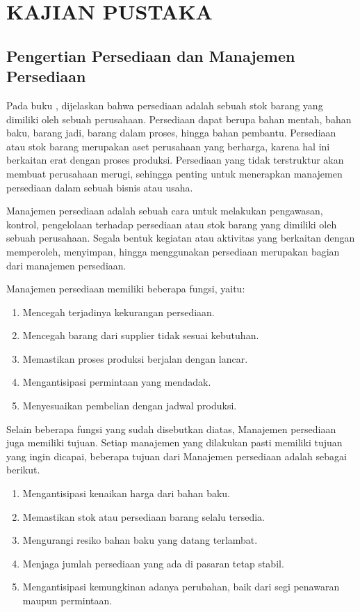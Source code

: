 
\chapter{KAJIAN PUSTAKA} 

\section{Pengertian Persediaan dan Manajemen Persediaan}

Pada buku \citep{dasarmanajemen}, dijelaskan bahwa persediaan adalah sebuah stok barang yang dimiliki oleh sebuah perusahaan. Persediaan dapat berupa bahan mentah, bahan baku, barang jadi, barang dalam proses, hingga bahan pembantu. Persediaan atau stok barang merupakan aset perusahaan yang berharga, karena hal ini berkaitan erat dengan proses produksi. Persediaan yang tidak terstruktur akan membuat perusahaan merugi, sehingga penting untuk menerapkan manajemen persediaan dalam sebuah bisnis atau usaha.

Manajemen persediaan adalah sebuah cara untuk melakukan pengawasan, kontrol, pengelolaan terhadap persediaan atau stok barang yang dimiliki oleh sebuah perusahaan. Segala bentuk kegiatan atau aktivitas yang berkaitan dengan memperoleh, menyimpan, hingga menggunakan persediaan merupakan bagian dari manajemen persediaan.

Manajemen persediaan memiliki beberapa fungsi, yaitu:
\begin{enumerate}
	\item Mencegah terjadinya kekurangan persediaan.
	\item Mencegah barang dari supplier tidak sesuai kebutuhan.
	\item Memastikan proses produksi berjalan dengan lancar.
	\item Mengantisipasi permintaan yang mendadak.
	\item Menyesuaikan pembelian dengan jadwal produksi.
\end{enumerate}

Selain beberapa fungsi yang sudah disebutkan diatas, Manajemen persediaan juga memiliki tujuan. Setiap manajemen yang dilakukan pasti memiliki tujuan yang ingin dicapai, beberapa tujuan dari Manajemen persediaan adalah sebagai berikut.
\begin{enumerate}
	\item Mengantisipasi kenaikan harga dari bahan baku.
	\item Memastikan stok atau persediaan barang selalu tersedia.
	\item Mengurangi resiko bahan baku yang datang terlambat.
	\item Menjaga jumlah persediaan yang ada di pasaran tetap stabil.
	\item Mengantisipasi kemungkinan adanya perubahan, baik dari segi penawaran maupun permintaan.
\end{enumerate}

